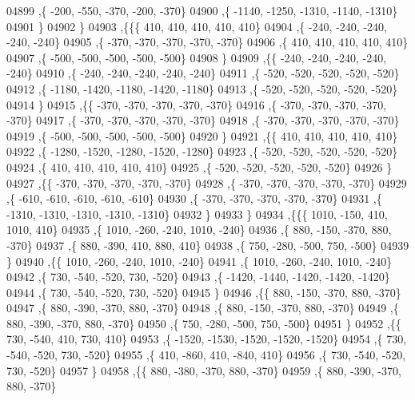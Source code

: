 \begin{DoxyCode}
04899     ,\{  -200,  -550,  -370,  -200,  -370\}
04900     ,\{ -1140, -1250, -1310, -1140, -1310\}
04901     \}
04902    \}
04903   ,\{\{\{   410,   410,   410,   410,   410\}
04904     ,\{  -240,  -240,  -240,  -240,  -240\}
04905     ,\{  -370,  -370,  -370,  -370,  -370\}
04906     ,\{   410,   410,   410,   410,   410\}
04907     ,\{  -500,  -500,  -500,  -500,  -500\}
04908     \}
04909    ,\{\{  -240,  -240,  -240,  -240,  -240\}
04910     ,\{  -240,  -240,  -240,  -240,  -240\}
04911     ,\{  -520,  -520,  -520,  -520,  -520\}
04912     ,\{ -1180, -1420, -1180, -1420, -1180\}
04913     ,\{  -520,  -520,  -520,  -520,  -520\}
04914     \}
04915    ,\{\{  -370,  -370,  -370,  -370,  -370\}
04916     ,\{  -370,  -370,  -370,  -370,  -370\}
04917     ,\{  -370,  -370,  -370,  -370,  -370\}
04918     ,\{  -370,  -370,  -370,  -370,  -370\}
04919     ,\{  -500,  -500,  -500,  -500,  -500\}
04920     \}
04921    ,\{\{   410,   410,   410,   410,   410\}
04922     ,\{ -1280, -1520, -1280, -1520, -1280\}
04923     ,\{  -520,  -520,  -520,  -520,  -520\}
04924     ,\{   410,   410,   410,   410,   410\}
04925     ,\{  -520,  -520,  -520,  -520,  -520\}
04926     \}
04927    ,\{\{  -370,  -370,  -370,  -370,  -370\}
04928     ,\{  -370,  -370,  -370,  -370,  -370\}
04929     ,\{  -610,  -610,  -610,  -610,  -610\}
04930     ,\{  -370,  -370,  -370,  -370,  -370\}
04931     ,\{ -1310, -1310, -1310, -1310, -1310\}
04932     \}
04933    \}
04934   ,\{\{\{  1010,  -150,   410,  1010,   410\}
04935     ,\{  1010,  -260,  -240,  1010,  -240\}
04936     ,\{   880,  -150,  -370,   880,  -370\}
04937     ,\{   880,  -390,   410,   880,   410\}
04938     ,\{   750,  -280,  -500,   750,  -500\}
04939     \}
04940    ,\{\{  1010,  -260,  -240,  1010,  -240\}
04941     ,\{  1010,  -260,  -240,  1010,  -240\}
04942     ,\{   730,  -540,  -520,   730,  -520\}
04943     ,\{ -1420, -1440, -1420, -1420, -1420\}
04944     ,\{   730,  -540,  -520,   730,  -520\}
04945     \}
04946    ,\{\{   880,  -150,  -370,   880,  -370\}
04947     ,\{   880,  -390,  -370,   880,  -370\}
04948     ,\{   880,  -150,  -370,   880,  -370\}
04949     ,\{   880,  -390,  -370,   880,  -370\}
04950     ,\{   750,  -280,  -500,   750,  -500\}
04951     \}
04952    ,\{\{   730,  -540,   410,   730,   410\}
04953     ,\{ -1520, -1530, -1520, -1520, -1520\}
04954     ,\{   730,  -540,  -520,   730,  -520\}
04955     ,\{   410,  -860,   410,  -840,   410\}
04956     ,\{   730,  -540,  -520,   730,  -520\}
04957     \}
04958    ,\{\{   880,  -380,  -370,   880,  -370\}
04959     ,\{   880,  -390,  -370,   880,  -370\}

\end{DoxyCode}
